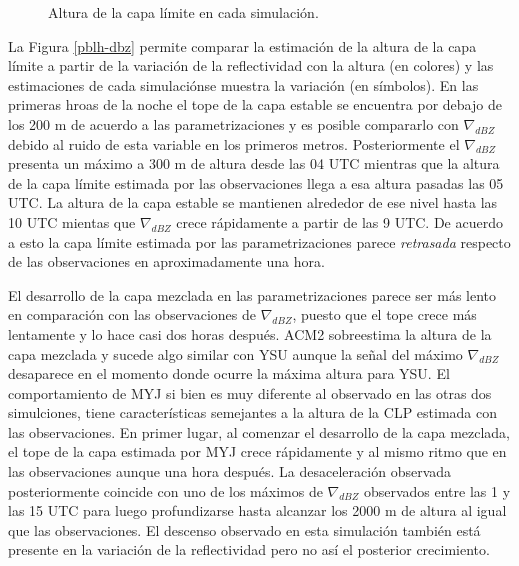\documentclass[12pt,spanish,oneside, a4paper]{book}
\begin{document}
\begin{figure}

{\centering {}\newline{}

}

\caption{Altura de la capa límite en cada simulación. \label{pblh-wrf}}\label{fig:pblh-wrf}
\end{figure}

La Figura \ref{pblh-dbz} permite comparar la estimación de la altura de
la capa límite a partir de la variación de la reflectividad con la
altura (en colores) y las estimaciones de cada simulaciónse muestra la
variación (en símbolos). En las primeras hroas de la noche el tope de la
capa estable se encuentra por debajo de los 200 m de acuerdo a las
parametrizaciones y es posible compararlo con \(\nabla_{dBZ}\) debido al
ruido de esta variable en los primeros metros. Posteriormente el
\(\nabla_{dBZ}\) presenta un máximo a 300 m de altura desde las 04 UTC
mientras que la altura de la capa límite estimada por las observaciones
llega a esa altura pasadas las 05 UTC. La altura de la capa estable se
mantienen alrededor de ese nivel hasta las 10 UTC mientas que
\(\nabla_{dBZ}\) crece rápidamente a partir de las 9 UTC. De acuerdo a
esto la capa límite estimada por las parametrizaciones parece
\emph{retrasada} respecto de las observaciones en aproximadamente una
hora.

El desarrollo de la capa mezclada en las parametrizaciones parece ser
más lento en comparación con las observaciones de \(\nabla_{dBZ}\),
puesto que el tope crece más lentamente y lo hace casi dos horas
después. ACM2 sobreestima la altura de la capa mezclada y sucede algo
similar con YSU aunque la señal del máximo \(\nabla_{dBZ}\) desaparece
en el momento donde ocurre la máxima altura para YSU. El comportamiento
de MYJ si bien es muy diferente al observado en las otras dos
simulciones, tiene características semejantes a la altura de la CLP
estimada con las observaciones. En primer lugar, al comenzar el
desarrollo de la capa mezclada, el tope de la capa estimada por MYJ
crece rápidamente y al mismo ritmo que en las observaciones aunque una
hora después. La desaceleración observada posteriormente coincide con
uno de los máximos de \(\nabla_{dBZ}\) observados entre las 1 y las 15
UTC para luego profundizarse hasta alcanzar los 2000 m de altura al
igual que las observaciones. El descenso observado en esta simulación
también está presente en la variación de la reflectividad pero no así el
posterior crecimiento.
\end{document}
